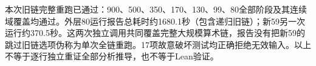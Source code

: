 本次旧链完整重跑已通过：900、500、350、170、130、99、80全部阶段及其连续域覆盖均通过。外层80运行报告总耗时约1680.1秒（包含递归旧链）；新59另一次运行约370.5秒。这两次独立调用共同覆盖完整大规模算术链，报告没有把新59的跳过旧链选项伪称为单次全链重跑。17项故意破坏测试均正确拒绝无效输入。以上不等于逐行独立重证全部分析推导，也不等于Lean验证。
